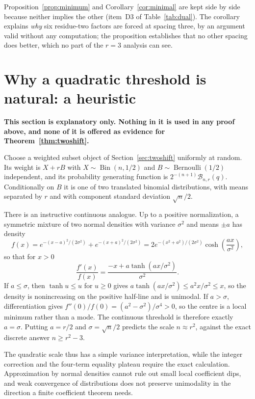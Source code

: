 \documentclass[11pt]{article}
\theoremstyle{research}
\theoremstyle{definition}
\newcommand{\TS}{\mathcal B}
\numberwithin{equation}{section}
\begin{document}
Proposition~\ref{prop:minimum} and Corollary~\ref{cor:minimal} are kept
side by side because neither implies the other (item~D3 of
Table~\ref{tab:dual}). The corollary explains \emph{why} six residue-two
factors are forced at spacing three, by an argument valid without any
computation; the proposition establishes that no other spacing does better,
which no part of the $r=3$ analysis can see.

\section{Why a quadratic threshold is natural: a heuristic}
\label{sec:probability}
\noindent\textbf{This section is explanatory only. Nothing in it is used in
any proof above, and none of it is offered as evidence for
Theorem~\ref{thm:twoshift}.}

Choose a weighted subset object of Section~\ref{sec:twoshift} uniformly at
random. Its weight is $X+rB$ with $X\sim\operatorname{Bin}(n,1/2)$ and
$B\sim\operatorname{Bernoulli}(1/2)$ independent, and its probability
generating function is $2^{-(n+1)}\TS_{n,r}(q)$. Conditionally on $B$ it is
one of two translated binomial distributions, with means separated by $r$
and with component standard deviation $\sqrt n/2$.

There is an instructive continuous analogue. Up to a positive
normalization, a symmetric mixture of two normal densities with variance
$\sigma^2$ and means $\pm a$ has density
\[
 f(x)=e^{-(x-a)^2/(2\sigma^2)}+e^{-(x+a)^2/(2\sigma^2)}
     =2e^{-(x^2+a^2)/(2\sigma^2)}\cosh\!\left(\frac{ax}{\sigma^2}\right),
\]
so that for $x>0$
\[
 \frac{f'(x)}{f(x)}=\frac{-x+a\tanh(ax/\sigma^2)}{\sigma^2}.
\]
If $a\le\sigma$, then $\tanh u\le u$ for $u\ge0$ gives
$a\tanh(ax/\sigma^2)\le a^2x/\sigma^2\le x$, so the density is
nonincreasing on the positive half-line and is unimodal. If $a>\sigma$,
differentiation gives $f''(0)/f(0)=(a^2-\sigma^2)/\sigma^4>0$, so the
centre is a local minimum rather than a mode. The continuous threshold is
therefore exactly $a=\sigma$. Putting $a=r/2$ and $\sigma=\sqrt n/2$
predicts the scale $n\approx r^2$, against the exact discrete answer
$n\ge r^2-3$.

The quadratic scale thus has a simple variance interpretation, while the
integer correction and the four-term equality plateau require the exact
calculation. Approximation by normal densities cannot rule out small local
coefficient dips, and weak convergence of distributions does not preserve
unimodality in the direction a finite coefficient theorem needs.
\end{document}
